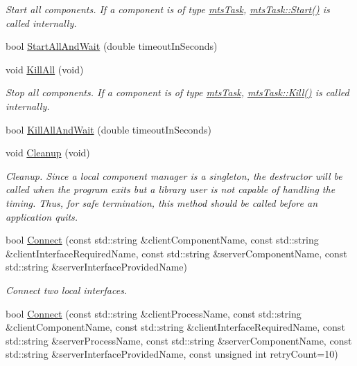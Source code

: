 \begin{DoxyCompactItemize}
\begin{DoxyCompactList}\small\item\em Start all components. If a component is of type \hyperlink{classmts_task}{mts\+Task}, \hyperlink{classmts_component_abfb4a63739ec45a9cdb91e3363db7c5c}{mts\+Task\+::\+Start()} is called internally. \end{DoxyCompactList}\item 
bool \hyperlink{classmts_manager_local_a5f60a05bb9cb176856fd81ac6b87d95f}{Start\+All\+And\+Wait} (double timeout\+In\+Seconds)
\item 
void \hyperlink{classmts_manager_local_ad3c234dc4d886414f68e218c573d4489}{Kill\+All} (void)
\begin{DoxyCompactList}\small\item\em Stop all components. If a component is of type \hyperlink{classmts_task}{mts\+Task}, \hyperlink{classmts_task_a67a15d7fffef28708b813e2ea624e4f8}{mts\+Task\+::\+Kill()} is called internally. \end{DoxyCompactList}\item 
bool \hyperlink{classmts_manager_local_a14ee33b85977480846050a42827d368c}{Kill\+All\+And\+Wait} (double timeout\+In\+Seconds)
\item 
void \hyperlink{classmts_manager_local_a475c241a9228eeb53bb7227a3fa348a3}{Cleanup} (void)
\begin{DoxyCompactList}\small\item\em Cleanup. Since a local component manager is a singleton, the destructor will be called when the program exits but a library user is not capable of handling the timing. Thus, for safe termination, this method should be called before an application quits. \end{DoxyCompactList}\item 
bool \hyperlink{classmts_manager_local_abbc3c68b1860cf6a3dda6acaae63722f}{Connect} (const std\+::string \&client\+Component\+Name, const std\+::string \&client\+Interface\+Required\+Name, const std\+::string \&server\+Component\+Name, const std\+::string \&server\+Interface\+Provided\+Name)
\begin{DoxyCompactList}\small\item\em Connect two local interfaces. \end{DoxyCompactList}\item 
bool \hyperlink{classmts_manager_local_a23f4154fc0afcd149e268a8bc114ae2e}{Connect} (const std\+::string \&client\+Process\+Name, const std\+::string \&client\+Component\+Name, const std\+::string \&client\+Interface\+Required\+Name, const std\+::string \&server\+Process\+Name, const std\+::string \&server\+Component\+Name, const std\+::string \&server\+Interface\+Provided\+Name, const unsigned int retry\+Count=10)

\end{DoxyCompactItemize}
